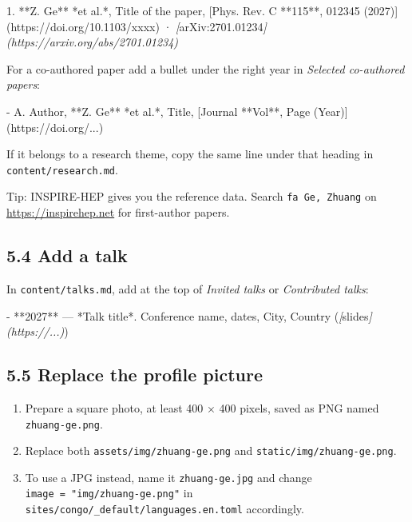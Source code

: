 \documentclass[
  10pt,
]{article}
\newenvironment{Shaded}{\begin{snugshade}}{\end{snugshade}}
\newcommand{\CommentTok}[1]{\textcolor[rgb]{0.56,0.35,0.01}{\textit{#1}}}
\newcommand{\NormalTok}[1]{#1}
\newcommand{\OtherTok}[1]{\textcolor[rgb]{0.56,0.35,0.01}{#1}}
\newcommand{\SpecialStringTok}[1]{\textcolor[rgb]{0.31,0.60,0.02}{#1}}
\providecommand{\tightlist}{%
  \setlength{\itemsep}{0pt}\setlength{\parskip}{0pt}}
\begin{document}
\begin{Shaded}
\begin{Highlighting}[]
\SpecialStringTok{1. }\NormalTok{**Z. Ge** *et al.*, Title of the paper, [Phys. Rev. C **115**, 012345 (2027)](https://doi.org/10.1103/xxxx) · }\CommentTok{[}\OtherTok{arXiv:2701.01234}\CommentTok{](https://arxiv.org/abs/2701.01234)}
\end{Highlighting}
\end{Shaded}

For a co-authored paper add a bullet under the right year in
\emph{Selected co-authored papers}:

\begin{Shaded}
\begin{Highlighting}[]
\SpecialStringTok{{-} }\NormalTok{A. Author, **Z. Ge** *et al.*, Title, [Journal **Vol**, Page (Year)](https://doi.org/...)}
\end{Highlighting}
\end{Shaded}

If it belongs to a research theme, copy the same line under that heading
in \texttt{content/research.md}.

Tip: INSPIRE-HEP gives you the reference data. Search
\texttt{fa\ Ge,\ Zhuang} on \url{https://inspirehep.net} for
first-author papers.

\hypertarget{add-a-talk}{%
\subsection{5.4 Add a talk}\label{add-a-talk}}

In \texttt{content/talks.md}, add at the top of \emph{Invited talks} or
\emph{Contributed talks}:

\begin{Shaded}
\begin{Highlighting}[]
\SpecialStringTok{{-} }\NormalTok{**2027** — *Talk title*. Conference name, dates, City, Country (}\CommentTok{[}\OtherTok{slides}\CommentTok{](https://...)}\NormalTok{)}
\end{Highlighting}
\end{Shaded}

\hypertarget{replace-the-profile-picture}{%
\subsection{5.5 Replace the profile
picture}\label{replace-the-profile-picture}}

\begin{enumerate}
\def\labelenumi{\arabic{enumi}.}
\tightlist
\item
  Prepare a square photo, at least 400 × 400 pixels, saved as PNG named
  \texttt{zhuang-ge.png}.
\item
  Replace both \texttt{assets/img/zhuang-ge.png} and
  \texttt{static/img/zhuang-ge.png}.
\item
  To use a JPG instead, name it \texttt{zhuang-ge.jpg} and change
  \texttt{image\ =\ "img/zhuang-ge.png"} in
  \texttt{sites/congo/\_default/languages.en.toml} accordingly.
\end{enumerate}
\end{document}
